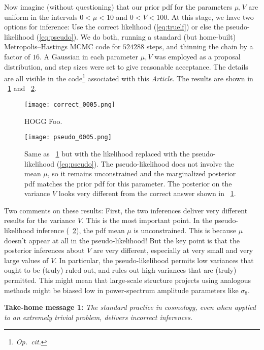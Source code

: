 \documentclass[12pt, letterpaper, preprint]{aastex}
\newcommand{\foreign}[1]{\textsl{#1}}
\newcommand{\opcit}{\foreign{Op.~cit.}}
\newcommand{\documentname}{\textsl{Article}}
\begin{document}
Now imagine (without questioning) that our prior pdf for the
parameters $\mu, V$ are uniform in the intervals $0<\mu<10$ and
$0<V<100$.
At this stage, we have two options for inference: Use the correct
likelihood (\ref{eq:truelf}) or else the pseudo-likelihood
(\ref{eq:pseudo}).
We do both, running a standard (but home-built) Metropolis--Hastings
MCMC code for $524288$ steps, and thinning the chain by a factor of
$16$.
A Gaussian in each parameter $\mu,V$ was employed as a proposal
distribution, and step sizes were set to give reasonable acceptance.
The details are all visible in the code\footnote{\opcit} associated
with this \documentname.
The results are shown in \figurename~\ref{fig:correct} and
\figurename~\ref{fig:pseudo}.%
\begin{figure}
\texttt{[image: correct\_0005.png]}
\caption{HOGG Foo.\label{fig:correct}}
\end{figure}%
\begin{figure}
\texttt{[image: pseudo\_0005.png]}
\caption{Same as \figurename~\ref{fig:correct} but with the likelihood
  replaced with the pseudo-likelihood (\ref{eq:pseudo}). The
  pseudo-likelihood does not involve the mean $\mu$, so it remains
  unconstrained and the marginalized posterior pdf matches the prior
  pdf for this parameter. The posterior on the variance $V$ looks very
  different from the correct answer shown in
  \figurename~\ref{fig:correct}.\label{fig:pseudo}}
\end{figure}

Two comments on these results:
First, the two inferences deliver very different results for the
variance $V$. This is the most important point.
In the pseudo-likelihood inference (\figurename~\ref{fig:pseudo}), the
pdf mean $\mu$ is unconstrained. This is because $\mu$ doesn't appear
at all in the pseudo-likelihood! But the key point is that the
posterior inferences about $V$ are very different, especially at very
small and very large values of $V$.
In particular, the pseudo-likelihood permits low variances that ought
to be (truly) ruled out, and rules out high variances that are (truly)
permitted. This might mean that large-scale structure projects using
analogous methods might be biased low in power-spectrum amplitude
parameters like $\sigma_8$.

\textbf{Take-home message 1:} \emph{The standard practice in
  cosmology, even when applied to an extremely trivial problem,
  delivers incorrect inferences.}
\end{document}
